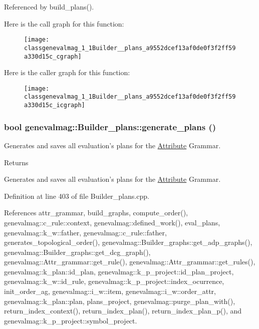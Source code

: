 Referenced by build\_\-plans().



Here is the call graph for this function:\nopagebreak
\begin{figure}[H]
\begin{center}
\leavevmode
\texttt{[image: classgenevalmag\_1\_1Builder\_\_plans\_a9552dcef13af0de0f3f2ff59a330d15c\_cgraph]}
\end{center}
\end{figure}




Here is the caller graph for this function:\nopagebreak
\begin{figure}[H]
\begin{center}
\leavevmode
\texttt{[image: classgenevalmag\_1\_1Builder\_\_plans\_a9552dcef13af0de0f3f2ff59a330d15c\_icgraph]}
\end{center}
\end{figure}


\hypertarget{classgenevalmag_1_1Builder__plans_a5002819447c17a1f81c197da66bd3e56}{
\subsubsection[{generate\_\-plans}]{\setlength{\rightskip}{0pt plus 5cm}bool genevalmag::Builder\_\-plans::generate\_\-plans ()}}
\label{classgenevalmag_1_1Builder__plans_a5002819447c17a1f81c197da66bd3e56}
Generates and saves all evaluation's plans for the \hyperlink{classgenevalmag_1_1Attribute}{Attribute} Grammar. \begin{DoxyReturn}{Returns}

\end{DoxyReturn}
Generates and saves all evaluation's plans for the \hyperlink{classgenevalmag_1_1Attribute}{Attribute} Grammar. 

Definition at line 403 of file Builder\_\-plans.cpp.



References attr\_\-grammar, build\_\-graphs, compute\_\-order(), genevalmag::c\_\-rule::context, genevalmag::defined\_\-work(), eval\_\-plans, genevalmag::k\_\-w::father, genevalmag::c\_\-rule::father, generates\_\-topological\_\-order(), genevalmag::Builder\_\-graphs::get\_\-adp\_\-graphs(), genevalmag::Builder\_\-graphs::get\_\-dcg\_\-graph(), genevalmag::Attr\_\-grammar::get\_\-rule(), genevalmag::Attr\_\-grammar::get\_\-rules(), genevalmag::k\_\-plan::id\_\-plan, genevalmag::k\_\-p\_\-project::id\_\-plan\_\-project, genevalmag::k\_\-w::id\_\-rule, genevalmag::k\_\-p\_\-project::index\_\-ocurrence, init\_\-order\_\-ag, genevalmag::i\_\-w::item, genevalmag::i\_\-w::order\_\-attr, genevalmag::k\_\-plan::plan, plans\_\-project, genevalmag::purge\_\-plan\_\-with(), return\_\-index\_\-context(), return\_\-index\_\-plan(), return\_\-index\_\-plan\_\-p(), and genevalmag::k\_\-p\_\-project::symbol\_\-project.



